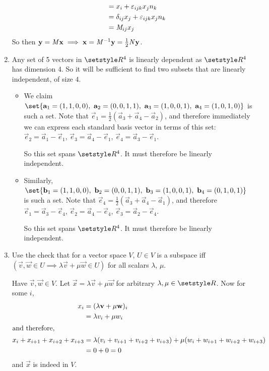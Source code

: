\documentclass[fleqn,a4paper,11pt]{article}
\begin{document}
\begin{enumerate}[label=\textbf{\arabic*.}]
\begin{alignat*}
    &&           &= x_i + \epsilon_{ijk} x_j n_k \\
    &&           &= \delta_{ij} x_j + \epsilon_{ijk} x_j n_k \\
    &&           &= \mat M_{ij} x_j
   \end{alignat*}
   So then \(\vec y = \mat M \vec x \implies
    \vec x = \mat M^{-1} \vec y = \frac 12 \mat N \vec y\).
   \item
    Any set of 5 vectors in \(\Reals^4\) is linearly dependent as
    \(\Reals^4\) has dimension \(4\). So it will be sufficient to find two
    subsets that are linearly independent, of size \(4\).
    \begin{itemize}
     \item
      We claim
      \(\set{\vec a_1 = (1, 1, 0, 0),\ \vec a_2 = (0, 0, 1, 1),
           \ \vec a_3 = (1, 0, 0, 1),\ \vec a_4 = (1, 0, 1, 0)}\)
      is such a set. Note that
      \(\vec e_1 = \frac 12 (\vec a_3 + \vec a_4 - \vec a_2)\), and therefore
      immediately we can express each standard basis vector in terms of this
      set:
      \(\vec e_2 = \vec a_1 - \vec e_1\),
      \(\vec e_3 = \vec a_4 - \vec e_1\),
      \(\vec e_4 = \vec a_3 - \vec e_1\).

      So this set spans \(\Reals^4\). It must therefore be linearly independent.
     \item
      Similarly,
      \(\set{\vec b_1 = (1, 1, 0, 0),\ \vec b_2 = (0, 0, 1, 1),
           \ \vec b_3 = (1, 0, 0, 1),\ \vec b_4 = (0, 1, 0, 1)}\)
      is such a set. Note that
      \(\vec e_4 = \frac 12 (\vec a_3 + \vec a_4 - \vec a_1)\), and therefore
      \(\vec e_1 = \vec a_3 - \vec e_4\),
      \(\vec e_2 = \vec a_4 - \vec e_4\),
      \(\vec e_3 = \vec a_2 - \vec e_4\).

      So this set spans \(\Reals^4\). It must therefore be linearly independent.
    \end{itemize}
   \item
    Use the check that for a vector space \(V\), \(U \in V\) is a subspace iff
    \\ \((\vec v, \vec w \in U \implies \lambda \vec v + \mu \vec w \in U)\) for
    all scalars \(\lambda\), \(\mu\).

    Have \(\vec v, \vec w \in V\). Let \(\vec x = \lambda \vec v + \mu \vec w\)
    for arbitrary \(\lambda, \mu \in \Reals\). Now for some \(i\),
    \begin{align*}
     x_i &= (\lambda \vec v + \mu \vec w)_i \\
         &= \lambda v_i + \mu w_i \\
     \intertext{and therefore,}
     x_i + x_{i + 1} + x_{i + 2} + x_{i + 3} &=
      \lambda(v_i + v_{i + 1} + v_{i + 2} + v_{i + 3}) +
      \mu(w_i + w_{i + 1} + w_{i + 2} + w_{i + 3}) \\
      &= 0 + 0 = 0
    \end{align*}
    and \(\vec x\) is indeed in \(V\).


\end{enumerate}
\end{document}
